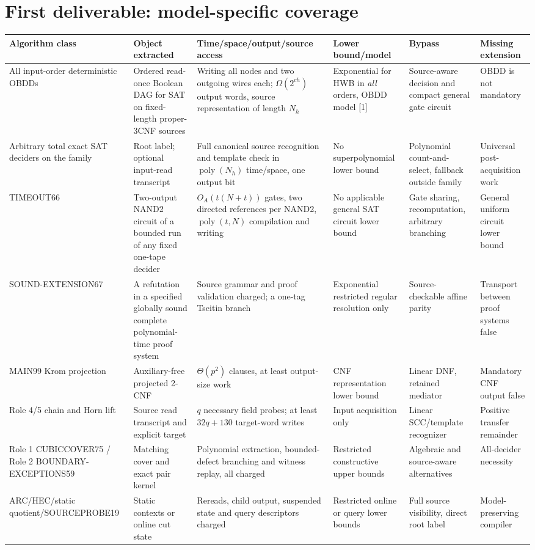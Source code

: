 \documentclass[11pt]{article}
\begin{document}
\section{First deliverable: model-specific coverage}
\scriptsize
\begin{longtable}{p{.14\linewidth}p{.16\linewidth}p{.24\linewidth}p{.14\linewidth}p{.15\linewidth}p{.12\linewidth}}
\toprule
Algorithm class & Object extracted & Time/space/output/source access & Lower bound/model & Bypass & Missing extension\\\midrule\endhead
All input-order deterministic OBDDs & Ordered read-once Boolean DAG for SAT on fixed-length proper-3CNF sources & Writing all nodes and two outgoing wires each; $\Omega(2^{ch})$ output words, source representation of length $N_h$ & Exponential for HWB in \emph{all} orders, OBDD model [1] & Source-aware decision and compact general gate circuit & OBDD is not mandatory\\
Arbitrary total exact SAT deciders on the family & Root label; optional input-read transcript & Full canonical source recognition and template check in $\operatorname{poly}(N_h)$ time/space, one output bit & No superpolynomial lower bound & Polynomial count-and-select, fallback outside family & Universal post-acquisition work\\
TIMEOUT66 & Two-output NAND2 circuit of a bounded run of any fixed one-tape decider & $O_A(t(N+t))$ gates, two directed references per NAND2, $\operatorname{poly}(t,N)$ compilation and writing & No applicable general SAT circuit lower bound & Gate sharing, recomputation, arbitrary branching & General uniform circuit lower bound\\
SOUND-EXTENSION67 & A refutation in a specified globally sound complete polynomial-time proof system & Source grammar and proof validation charged; a one-tag Tseitin branch & Exponential restricted regular resolution only & Source-checkable affine parity & Transport between proof systems false\\
MAIN99 Krom projection & Auxiliary-free projected 2-CNF & $\Theta(p^2)$ clauses, at least output-size work & CNF representation lower bound & Linear DNF, retained mediator & Mandatory CNF output false\\
Role 4/5 chain and Horn lift & Source read transcript and explicit target & $q$ necessary field probes; at least $32q+130$ target-word writes & Input acquisition only & Linear SCC/template recognizer & Positive transfer remainder\\
Role 1 CUBICCOVER75 / Role 2 BOUNDARY-EXCEPTIONS59 & Matching cover and exact pair kernel & Polynomial extraction, bounded-defect branching and witness replay, all charged & Restricted constructive upper bounds & Algebraic and source-aware alternatives & All-decider necessity\\
ARC/HEC/static quotient/SOURCEPROBE19 & Static contexts or online cut state & Rereads, child output, suspended state and query descriptors charged & Restricted online or query lower bounds & Full source visibility, direct root label & Model-preserving compiler\\
\bottomrule
\end{longtable}\normalsize
\end{document}
